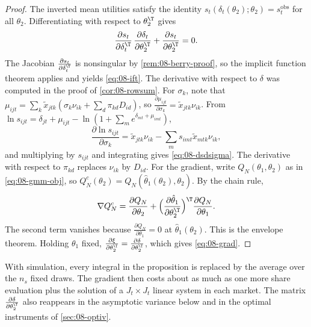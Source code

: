 \begin{proof}
The inverted mean utilities satisfy the identity $s_t(\delta_t(\theta_2);\theta_2) = s^{\text{obs}}_t$ for all
$\theta_2$. Differentiating with respect to $\theta_2^\T$ gives
\begin{equation*}
  \frac{\partial s_t}{\partial \delta_t^\T}\,\frac{\partial \delta_t}{\partial \theta_2^\T} +
  \frac{\partial s_t}{\partial \theta_2^\T} = 0.
\end{equation*}
The Jacobian $\frac{\partial s_t}{\partial \delta_t^\T}$ is nonsingular by \cref{rem:08-berry-proof}, so the
implicit function theorem applies and yields \eqref{eq:08-ift}. The derivative with respect to $\delta$ was
computed in the proof of \cref{cor:08-rowsum}. For $\sigma_k$, note that $\mu_{ijt} = \sum_k \tilde
x_{jtk}(\sigma_k\nu_{ik} + \sum_d \pi_{kd}D_{id})$, so $\frac{\partial \mu_{ijt}}{\partial \sigma_k} = \tilde
x_{jtk}\nu_{ik}$. From $\ln s_{ijt} = \delta_{jt} + \mu_{ijt} - \ln(1 + \sum_m e^{\delta_{mt} + \mu_{imt}})$,
\begin{equation*}
  \frac{\partial \ln s_{ijt}}{\partial \sigma_k} = \tilde x_{jtk}\nu_{ik} - \sum_m s_{imt}\tilde
  x_{mtk}\nu_{ik},
\end{equation*}
and multiplying by $s_{ijt}$ and integrating gives \eqref{eq:08-dsdsigma}. The derivative with respect to
$\pi_{kd}$ replaces $\nu_{ik}$ by $D_{id}$. For the gradient, write $Q_N(\theta_1, \theta_2)$ as in
\eqref{eq:08-gmm-obj}, so $Q^c_N(\theta_2) = Q_N(\hat\theta_1(\theta_2), \theta_2)$. By the chain rule,
\begin{equation*}
  \nabla Q^c_N = \frac{\partial Q_N}{\partial \theta_2} + \Big(\frac{\partial \hat\theta_1}{\partial
  \theta_2^\T}\Big)^\T\frac{\partial Q_N}{\partial \theta_1}.
\end{equation*}
The second term vanishes because $\frac{\partial Q_N}{\partial \theta_1} = 0$ at $\hat\theta_1(\theta_2)$.
This is the envelope theorem. Holding $\theta_1$ fixed, $\frac{\partial \xi}{\partial \theta_2^\T} =
\frac{\partial \delta}{\partial \theta_2^\T}$, which gives \eqref{eq:08-grad}.
\end{proof}

With simulation, every integral in the proposition is replaced by the average over the $n_s$ fixed draws.
The gradient then costs about as much as one more share evaluation plus the solution of a $J_t \times J_t$
linear system in each market. The matrix $\frac{\partial \delta}{\partial \theta_2^\T}$ also reappears in the
asymptotic variance below and in the optimal instruments of \cref{sec:08-optiv}.

